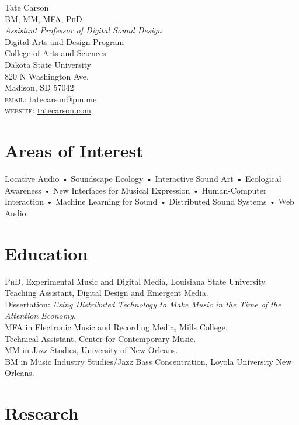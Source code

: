 \documentclass[12pt, a4paper]{article}
\newcommand{\years}[1]{\marginnote{\scriptsize #1}}
\begin{document}
{\Huge Tate Carson}\\[0.1cm]
\textsc{BM, MM, MFA, PhD}\\[0.9cm]
\emph{Assistant Professor of Digital Sound Design}\\
Digital Arts and Design Program \\
College of Arts and Sciences\\
Dakota State University \\ 
820 N Washington Ave.\\
Madison, SD 57042 \\[.2cm]

\textsc{email}: \href{mailto:tatecarson@pm.me}{tatecarson@pm.me}\\
\textsc{website}: \href{https://tatecarson.com}{tatecarson.com}


\section*{Areas of Interest}
Locative Audio • Soundscape Ecology • Interactive Sound Art • Ecological Awareness • New Interfaces for Musical Expression • Human-Computer Interaction • Machine Learning for Sound • Distributed Sound Systems • Web Audio



\section*{Education}
\noindent
\years{2021}\textsc{PhD}, Experimental Music and Digital Media, Louisiana State University.\\
Teaching Assistant, Digital Design and Emergent Media. \\
Dissertation: \emph{Using Distributed Technology to Make Music in the Time of the Attention Economy}.\\
\years{2017}\textsc{MFA} in Electronic Music and Recording Media, Mills College.\\
Technical Assistant, Center for Contemporary Music.\\
\years{2011}\textsc{MM} in Jazz Studies, University of New Orleans.\\
\years{2009}\textsc{BM} in Music Industry Studies/Jazz Bass Concentration, Loyola University New Orleans.

\section*{Research}
\end{document}
